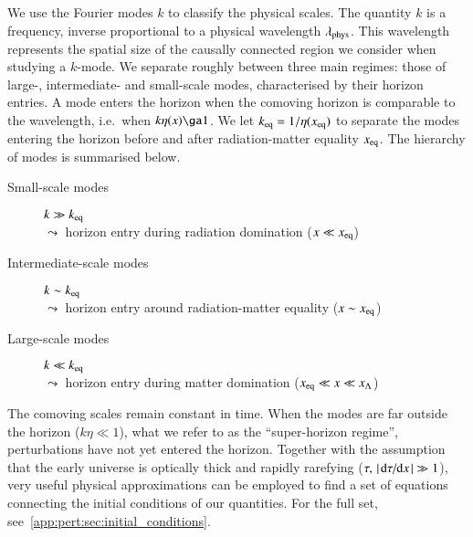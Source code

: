     We use the Fourier modes $k$ to classify the physical scales. The quantity $k$ is a frequency, inverse proportional to a physical wavelength $\lambda_\mathrm{phys}$. This wavelength represents the spatial size of the causally connected region we consider when studying a $k$-mode. We separate roughly between three main regimes: those of large-, intermediate- and small-scale modes, characterised by their horizon entries. A mode enters the horizon when the comoving horizon is comparable to the wavelength, i.e.\ when $k\eta(x) \ga 1$. We let $k_\mathrm{eq}= 1/\eta(x_\mathrm{eq})$ to separate the modes entering the horizon before and after radiation-matter equality $x_\mathrm{eq}$. The hierarchy of modes is summarised below.
    \begin{description}
        \item [Small-scale modes] $k \gg k_\mathrm{eq}$ \\
        $\leadsto$ horizon entry during radiation domination ($x\ll x_\mathrm{eq}$)
        \item[Intermediate-scale modes] $k \sim k_\mathrm{eq}$ \\
        $\leadsto$ horizon entry around radiation-matter equality ($x\sim x_\mathrm{eq}$)
        \item[Large-scale modes] $k \ll k_\mathrm{eq}$ \\
        $\leadsto$ horizon entry during matter domination ($x_\mathrm{eq} \ll x\ll x_\Lambda$)
    \end{description}


    The comoving scales remain constant in time. When the modes are far outside the horizon ($k\eta\ll 1$), what we refer to as the ``super-horizon regime'', perturbations have not yet entered the horizon. Together with the assumption that the early universe is optically thick and rapidly rarefying ($\tau,\, \abs{\dv*{\tau}{x}} \gg 1$), very useful physical approximations can be employed to find a set of equations connecting the initial conditions of our quantities. For the full set, see~\cref{app:pert:sec:initial_conditions}. 


